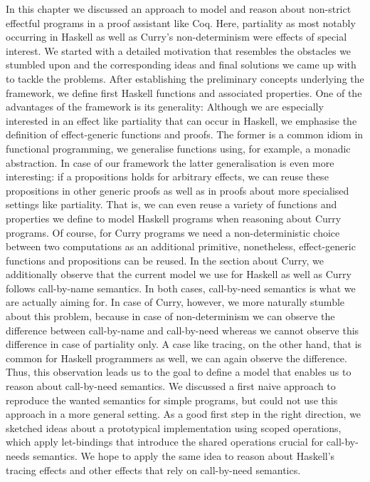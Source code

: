{In this chapter we discussed an approach to model and reason about non-strict effectful programs in a proof assistant like Coq.
Here, partiality as most notably occurring in Haskell as well as Curry's non-determinism were effects of special interest.
We started with a detailed motivation that resembles the obstacles we stumbled upon and the corresponding ideas and final solutions we came up with to tackle the problems.
After establishing the preliminary concepts underlying the  framework, we define first Haskell functions and associated properties.
One of the advantages of the framework is its generality: Although we are especially interested in an effect like partiality that can occur in Haskell, we emphasise the definition of effect-generic functions and proofs.
The former is a common idiom in functional programming, we generalise functions using, for example, a monadic abstraction.
In case of our framework the latter generalisation is even more interesting: if a propositions holds for arbitrary effects, we can reuse these propositions in other generic proofs as well as in proofs about more specialised settings like partiality.
That is, we can even reuse a variety of functions and properties we define to model Haskell programs when reasoning about Curry programs.
Of course, for Curry programs we need a non-deterministic choice between two computations as an additional primitive, nonetheless, effect-generic functions and propositions can be reused.
In the section about Curry, we additionally observe that the current model we use for Haskell as well as Curry follows call-by-name semantics.
In both cases, call-by-need semantics is what we are actually aiming for.
In case of Curry, however, we more naturally stumble about this problem, because in case of non-determinism we can observe the difference between call-by-name and call-by-need whereas we cannot observe this difference in case of partiality only.
A case like tracing, on the other hand, that is common for Haskell programmers as well, we can again observe the difference.
Thus, this observation leads us to the goal to define a model that enables us to reason about call-by-need semantics.
We discussed a first naive approach to reproduce the wanted semantics for simple programs, but could not use this approach in a more general setting.
As a good first step in the right direction, we sketched ideas about a prototypical implementation using scoped operations, which apply let-bindings that introduce the shared operations crucial for call-by-needs semantics.
We hope to apply the same idea to reason about Haskell's tracing effects and other effects that rely on call-by-need semantics.

}
